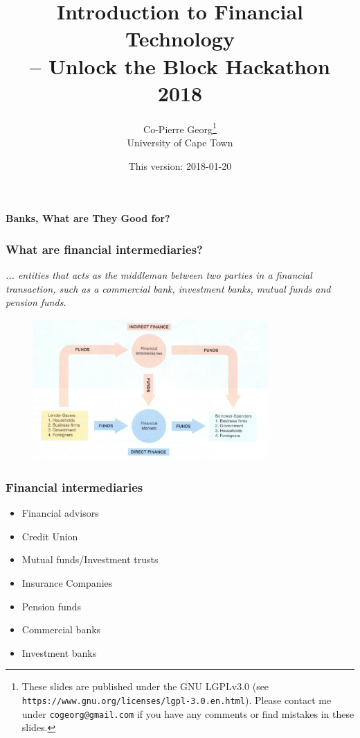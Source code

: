 \documentclass[11pt]{beamer}
\title{Introduction to Financial Technology\\ -- Unlock the Block Hackathon 2018}
\author[Co-Pierre Georg]
{Co-Pierre Georg\thanks{These slides are published under the GNU LGPLv3.0 (see \texttt{https://www.gnu.org/licenses/lgpl-3.0.en.html}). Please contact me under \texttt{cogeorg@gmail.com} if you have any comments or find mistakes in these slides.}\\
University of Cape Town}
\date{This version: 2018-01-20}
\begin{document}
%

\begin{frame}
  \titlepage
\end{frame}


\begin{frame}
  \begin{center}
    {\Large \textbf{Banks, What are They Good for?}}
  \end{center}
\end{frame}

\begin{frame}
\frametitle{What are financial intermediaries?}
\textit{... entities that acts as the middleman between two parties in a financial transaction, such as a commercial bank, investment banks, mutual funds and pension funds.}

\begin{figure}[h]
	 \includegraphics[width=0.8\textwidth]{Figures/intermediates.eps}
\end{figure}
\end{frame}

\begin{frame}
\frametitle{Financial intermediaries}
\hfill \break
\begin{itemize}
\item  Financial advisors
\item  Credit Union
\item Mutual funds/Investment trusts
\item  Insurance Companies
\item Pension funds
\item Commercial banks
\item Investment banks
\end{itemize}

\end{frame}
\end{document}
